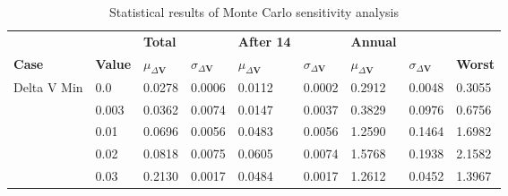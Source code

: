 \begin{table}[H]
\centering
\begin{tabular}{lllllllll}
 &  & \cellcolor[HTML]{EFEFEF}\textbf{Total} &  & \cellcolor[HTML]{EFEFEF}\textbf{After 14} & & \cellcolor[HTML]{EFEFEF}\textbf{Annual} & &\\
\rowcolor[HTML]{EFEFEF} 
\textbf{Case} & \textbf{Value} & \textbf{$\mu_{\Delta \boldsymbol{V}}$} & \textbf{$\sigma_{\Delta \boldsymbol{V}}$} & \textbf{$\mu_{\Delta \boldsymbol{V}}$} & \textbf{$\sigma_{\Delta \boldsymbol{V}}$} & \textbf{$\mu_{\Delta \boldsymbol{V}}$} & \textbf{$\sigma_{\Delta \boldsymbol{V}}$} & \textbf{Worst} \\ 
Delta V Min & 0.0 & 0.0278 & 0.0006 & 0.0112 & 0.0002 & 0.2912 & 0.0048 & 0.3055 \\ 
 & 0.003 & 0.0362 & 0.0074 & 0.0147 & 0.0037 & 0.3829 & 0.0976 & 0.6756 \\ 
 & 0.01 & 0.0696 & 0.0056 & 0.0483 & 0.0056 & 1.2590 & 0.1464 & 1.6982 \\ 
 & 0.02 & 0.0818 & 0.0075 & 0.0605 & 0.0074 & 1.5768 & 0.1938 & 2.1582 \\ 
 & 0.03 & 0.2130 & 0.0017 & 0.0484 & 0.0017 & 1.2612 & 0.0452 & 1.3967 \\ 
\end{tabular}
\caption{Statistical results of Monte Carlo sensitivity analysis}
\label{tab:SensitivityAnalysis}
\end{table}